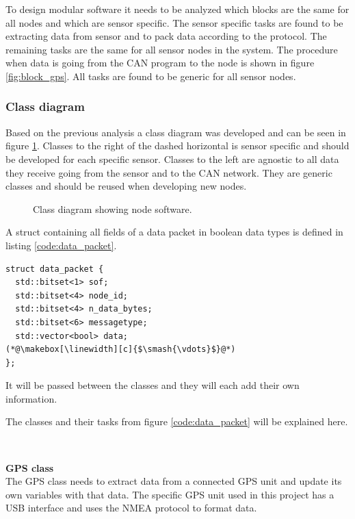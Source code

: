 To design modular software it needs to be analyzed which blocks are the same for all nodes and which are sensor specific.
The sensor specific tasks are found to be extracting data from sensor and to pack data according to the protocol.
The remaining tasks are the same for all sensor nodes in the system. 
The procedure when data is going from the CAN program to the node is shown in figure \ref{fig:block_gps}.
All tasks are found to be generic for all sensor nodes.

\subsubsection*{Class diagram}
Based on the previous analysis a class diagram was developed and can be seen in figure \ref{fig:node_class_diagram}.
Classes to the right of the dashed horizontal is sensor specific and should be developed for each specific sensor.
Classes to the left are agnostic to all data they receive going from the sensor and to the CAN network.
They are generic classes and should be reused when developing new nodes.

\begin{figure}[!h]
\centering
{}
\caption{Class diagram showing node software.}
\label{fig:node_class_diagram}
\end{figure}

A struct containing all fields of a data packet in boolean data types is defined in listing \ref{code:data_packet}.  

\begin{lstlisting}[caption=Struct for data packet.,label=code:data_packet]
struct data_packet {
  std::bitset<1> sof;
  std::bitset<4> node_id;
  std::bitset<4> n_data_bytes;
  std::bitset<6> messagetype;
  std::vector<bool> data;
(*@\makebox[\linewidth][c]{$\smash{\vdots}$}@*)
};
\end{lstlisting}
It will be passed between the classes and they will each add their own information. 

The classes and their tasks from figure \ref{code:data_packet} will be explained here.


~\\ \par \textbf{GPS class} ~ \\
The GPS class needs to extract data from a connected GPS unit and update its own variables with that data.
The specific GPS unit used in this project has a USB interface and uses the NMEA protocol to format data.

